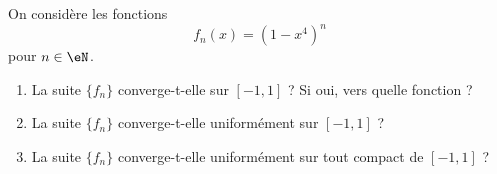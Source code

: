 

\begin{exercice}\label{exo111}

On considère les fonctions 
\begin{equation}
	f_n(x)=(1-x^4)^n
\end{equation}
pour $n\in\eN$.

\begin{enumerate}
\item La suite $\{f_n\}$ converge-t-elle sur $[-1,1]$ ? Si oui, vers quelle fonction ?
\item La suite $\{ f_n \}$ converge-t-elle uniformément sur $[-1,1]$ ?
\item La suite $\{ f_n \}$  converge-t-elle uniformément sur tout compact de $[-1,1]$ ?
\end{enumerate}

\end{exercice}
